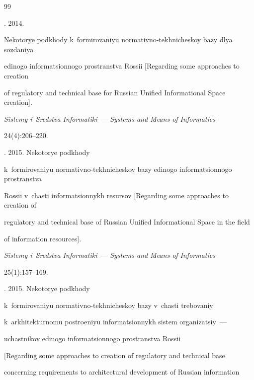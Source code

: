 {\small\frenchspacing

{%


\begin{thebibliography}{99}




. 2014. 

Nekotorye podkhody k~formirovaniyu normativno-tekhnicheskoy bazy dlya sozdaniya 

edinogo informatsionnogo prostranstva Rossii [Regarding some approaches to creation 

of regulatory and technical base for Russian Unified Informational Space creation]. 

\textit{Sistemy i~Sredstva Informatiki}~--- \textit{Systems and Means of Informatics} 

24(4):206--220.


. 2015. Nekotorye podkhody 

k~formirovaniyu normativno-tekhnicheskoy bazy edinogo informatsionnogo prostranstva 

Rossii v~chasti informatsionnykh resursov [Regarding some approaches to creation of 

regulatory and technical base of Russian Unified Informational Space in the field 

of information resources]. 

\textit{Sistemy i~Sredstva Informatiki}~--- \textit{Systems and Means of Informatics}

 25(1):157--169.


. 2015. Nekotorye podkhody 

k~formirovaniyu normativno-tekhnicheskoy bazy v~chasti trebovaniy 

k~arkhitekturnomu postroeniyu informatsionnykh sistem organizatsiy~--- 

uchastnikov edinogo informatsionnogo pro\-stran\-st\-va Rossii 

[Regarding some approaches to creation of regulatory and technical base 

concerning requirements to architectural development of Russian information 


\end{thebibliography}}}
